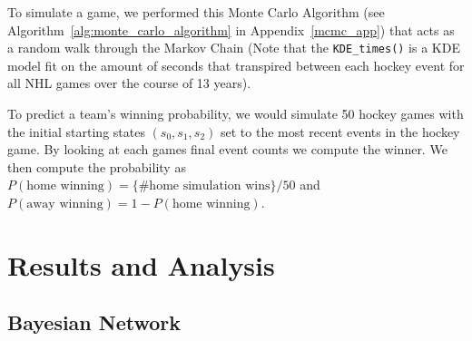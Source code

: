 \documentclass[11pt]{article}
\begin{document}
To simulate a game, we performed this Monte Carlo Algorithm (see Algorithm~\ref{alg:monte_carlo_algorithm} in Appendix~\ref{mcmc_app})
that acts as a random walk through the Markov Chain (Note that the {\tt KDE\_times()} is a KDE model fit on the amount of seconds that transpired between 
each hockey event for all NHL games over the course of 13 years).

            


To predict a team's winning probability, we would simulate 50 hockey games with the initial starting states 
$(s_0, s_1, s_2)$ set to the most recent events in the hockey game. By looking at each games
final event counts we compute the winner. We then compute the 
probability as $P(\text{home winning}) = \{\text{\# home simulation wins}\}/50$ and 
$P(\text{away winning}) = 1-P(\text{home winning})$.

\section{Results and Analysis}

\subsection{Bayesian Network}
\end{document}
